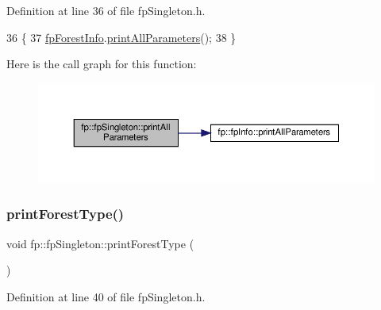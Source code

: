 Definition at line 36 of file fp\+Singleton.\+h.


\begin{DoxyCode}
36                                             \{
37                 \hyperlink{classfp_1_1fpSingleton_a85965009befa72a749ae498fa5b6ccfa}{fpForestInfo}.\hyperlink{classfp_1_1fpInfo_a471bd46c828547d5b556f6f4e9fca70f}{printAllParameters}();
38             \}
\end{DoxyCode}
Here is the call graph for this function\+:\nopagebreak
\begin{figure}[H]
\begin{center}
\leavevmode
\includegraphics[width=350pt]{classfp_1_1fpSingleton_a0d769b6652e4c74c2734cdc811eeab5a_cgraph}
\end{center}
\end{figure}
\mbox{\label{classfp_1_1fpSingleton_ad9696336521f72c7c6a021608799871e}} 
\subsubsection{\texorpdfstring{print\+Forest\+Type()}{printForestType()}}
{\footnotesize\ttfamily void fp\+::fp\+Singleton\+::print\+Forest\+Type (\begin{DoxyParamCaption}{ }\end{DoxyParamCaption})\hspace{0.3cm}{\ttfamily [inline]}}



Definition at line 40 of file fp\+Singleton.\+h.


